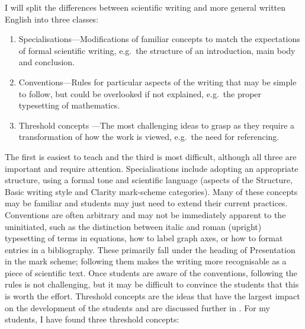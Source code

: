 I will split the differences between scientific writing and more general written English into three classes:
\begin{enumerate}
\item Specialisations---Modifications of familiar concepts to match the expectations of formal scientific writing, e.g.\ the structure of an introduction, main body and conclusion.
\item Conventions---Rules for particular aspects of the writing that may be simple to follow, but could be overlooked if not explained, e.g.\ the proper typesetting of mathematics.
\item Threshold concepts \citep{Meyer2003}---The most challenging ideas to grasp as they require a transformation of how the work is viewed, e.g.\ the need for referencing.
\end{enumerate}
The first is easiest to teach and the third is most difficult, although all three are important and require attention. Specialisations include adopting an appropriate structure, using a formal tone and scientific language (aspects of the Structure, Basic writing style and Clarity mark-scheme categories). Many of these concepts may be familiar and students may just need to extend their current practices. Conventions are often arbitrary and may not be immediately apparent to the uninitiated, such as the distinction between italic and roman (upright) typesetting of terms in equations, how to label graph axes, or how to format entries in a bibliography. These primarily fall under the heading of Presentation in the mark scheme; following them makes the writing more recognisable as a piece of scientific text. Once students are aware of the conventions, following the rules is not challenging, but it may be difficult to convince the students that this is worth the effort. Threshold concepts are the ideas that have the largest impact on the development of the students and are discussed further in . For my students, I have found three threshold concepts:
